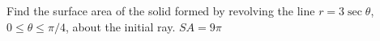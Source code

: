 {Find the surface area of the solid formed by revolving the line $r=3\sec\theta$, $0\leq\theta\leq\pi/4$, about the initial ray.
}
{$SA = 9\pi$
}
